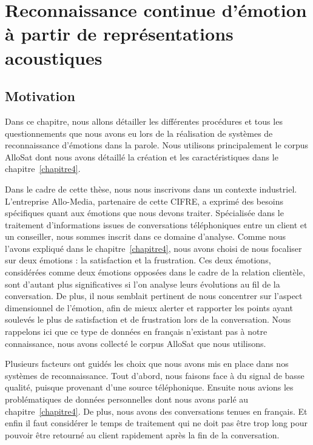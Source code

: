 \chapter{Reconnaissance continue d’émotion à partir de représentations acoustiques}
\label{chapitre5}

\section{Motivation}
Dans ce chapitre, nous allons détailler les différentes procédures et tous les questionnements que nous avons eu lors de la réalisation de systèmes de reconnaissance d'émotions dans la parole. Nous utilisons principalement le corpus AlloSat dont nous avons détaillé la création et les caractéristiques dans le chapitre~\ref{chapitre4}.

Dans le cadre de cette thèse, nous nous inscrivons dans un contexte industriel. L'entreprise Allo-Media, partenaire de cette CIFRE, a exprimé des besoins spécifiques quant aux émotions que nous devons traiter. Spécialisée dans le traitement d'informations issues de conversations téléphoniques entre un client et un conseiller, nous sommes inscrit dans ce domaine d'analyse. Comme nous l'avons expliqué dans le chapitre~\ref{chapitre4}, nous avons choisi de nous focaliser sur deux émotions : la satisfaction et la frustration. Ces deux émotions, considérées comme deux émotions opposées dans le cadre de la relation clientèle, sont d'autant plus significatives si l'on analyse leurs évolutions au fil de la conversation. De plus, il nous semblait pertinent de nous concentrer sur l'aspect dimensionnel de l'émotion, afin de mieux alerter et rapporter les points ayant soulevés le plus de satisfaction et de frustration lors de la conversation. Nous rappelons ici que ce type de données en français n'existant pas à notre connaissance, nous avons collecté le corpus AlloSat que nous utilisons.

Plusieurs facteurs ont guidés les choix que nous avons mis en place dans nos systèmes de reconnaissance. Tout d'abord, nous faisons face à du signal de basse qualité, puisque provenant d'une source téléphonique. Ensuite nous avions les problématiques de données personnelles dont nous avons parlé au chapitre~\ref{chapitre4}. De plus, nous avons des conversations tenues en français. Et enfin il faut considérer le temps de traitement qui ne doit pas être trop long pour pouvoir être retourné au client rapidement après la fin de la conversation.

